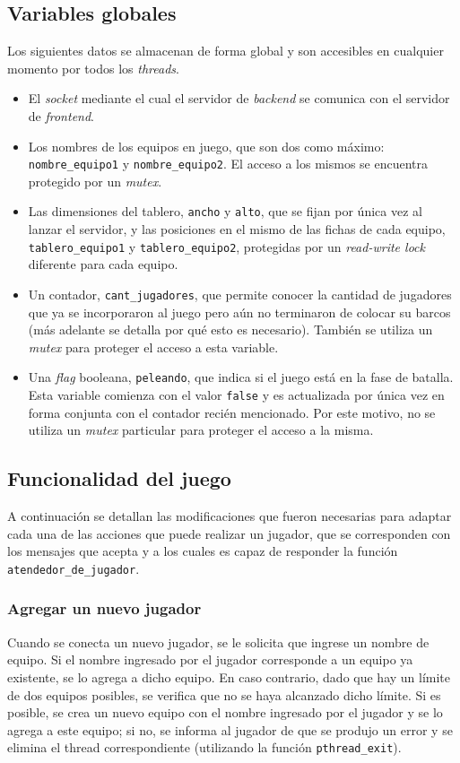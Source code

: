 \documentclass[a4paper]{article}
\begin{document}
\subsection{Variables globales}
Los siguientes datos se almacenan de forma global y son accesibles en
cualquier momento por todos los \emph{threads}.
\begin{itemize}
    \item El \emph{socket} mediante el cual el servidor de \emph{backend} se
    comunica con el servidor de \emph{frontend}.
    \item Los nombres de los equipos en juego, que son dos como máximo:
    \texttt{nombre\_equipo1} y \texttt{nombre\_equipo2}. El acceso a los
    mismos se encuentra protegido por un \emph{mutex}.
    \item Las dimensiones del tablero, \texttt{ancho} y \texttt{alto}, que se
    fijan por única vez al lanzar el servidor, y las posiciones en el mismo de
    las fichas de cada equipo, \texttt{tablero\_equipo1} y
    \texttt{tablero\_equipo2}, protegidas por un \emph{read-write lock}
    diferente para cada equipo.
    \item Un contador, \texttt{cant\_jugadores}, que permite conocer la
    cantidad de jugadores que ya se incorporaron al juego pero aún no
    terminaron de colocar su barcos (más adelante se detalla por qué esto es
    necesario). También se utiliza un \emph{mutex} para proteger el acceso a
    esta variable.
    \item Una \emph{flag} booleana, \texttt{peleando}, que indica si el juego
    está en la fase de batalla. Esta variable comienza con el valor
    \texttt{false} y es actualizada por única vez en forma conjunta con el
    contador recién mencionado. Por este motivo, no se utiliza un \emph{mutex}
    particular para proteger el acceso a la misma.
\end{itemize}

\subsection{Funcionalidad del juego}

A continuación se detallan las modificaciones que fueron necesarias para
adaptar cada una de las acciones que puede realizar un jugador, que se
corresponden con los mensajes que acepta y a los cuales es capaz de responder
la función \texttt{atendedor\_de\_jugador}.

\subsubsection*{Agregar un nuevo jugador}
Cuando se conecta un nuevo jugador, se le solicita que ingrese un nombre de
equipo. Si el nombre ingresado por el jugador corresponde
a un equipo ya existente, se lo agrega a dicho equipo. En caso contrario, dado
que hay un límite de dos equipos posibles, se verifica que no se haya
alcanzado dicho límite. Si es posible, se crea un nuevo equipo con el nombre
ingresado por el jugador y se lo agrega a este equipo; si no, se informa al
jugador de que se produjo un error y se elimina el thread correspondiente
(utilizando la función \texttt{pthread\_exit}).
\end{document}
